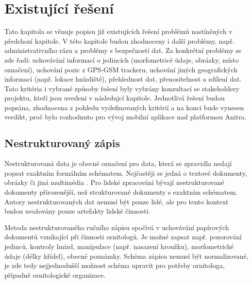 
\chapter{Existující řešení}

Tato kapitola se věnuje popisu již existujících řešení problémů nastíněných v předchozí kapitole. V této kapitole budou zhodnoceny i další problémy, např. administrativního rázu a problémy s bezpečností dat. Za konkrétní problémy se zde řadí: uchovávání informací o jedincích (morfometricé údaje, obrázky, místo označení), uchování pozic z GPS-GSM trackeru, uchování jiných geografických informací (např. lokace hnízdiště), přehlednost dat, přenositelnost a sdílení dat. Tato kritéria i vybrané způsoby řešení byly vybrány konzultací se stakeholdery projektu, kteří jsou uvedeni v následujcí kapitole. Jednotlivá řešení budou popsána, zhodnocena z pohledu vydefinovaných kritérií a na konci bude vynesen verdikt, proč bylo rozhodnuto pro vývoj mobilní aplikace nad platformou Anitra. 

\section{Nestrukturovaný zápis}

Nestrukturovaná data je obecné označení pro data, která se zpravidla nedají popsat exaktním formálním schématem. Nejčastěji se jedná o textové dokumenty, obrázky či jiná multimédia \cite{podnikovaInformatikaNestrukturovanaData}. Pro lidské zpracování bývají nestrukturované dokumenty přirozenější, než strukturované dokumenty s exaktním schématem. Autory nestrukturovaných dat nemusí být pouze lidé, ale pro tento kontext budou uvažovány pouze artefakty lidské činnosti.

Metoda nestrukturovaného ručního zápisu spočívá v uchovávání papírových dokumentů vznikající při činnosti ornitologů. Je možné zapsat např. pozorování jedinců, kontroly hnízd, manipulace (např. nasazení kroužku), morfometrické údaje (délky křídel), obecné poznámky. Schéma zápisu nemusí být normalizované, je zde tedy nejjednodušší možnost schéma upravit pro potřeby ornitologa, případně ornitologické organizace.

